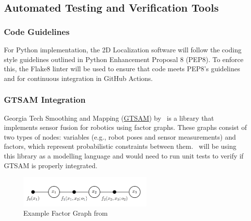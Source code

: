 \documentclass[12pt, titlepage]{article}
\begin{document}



\subsection{Automated Testing and Verification Tools}\label{plan_auto}

\subsubsection{Code Guidelines}
For Python implementation, the 2D Localization software will follow the coding style guidelines outlined in Python Enhancement Proposal 8 (PEP8). To enforce this, the Flake8 linter will be used to ensure that code meets PEP8's guidelines and for continuous integration in GitHub Actions.

\subsubsection{GTSAM Integration}
Georgia Tech Smoothing and Mapping (\href{https://github.com/borglab/gtsam}{GTSAM}) by~\cite{gtsam2022} is a library that implements sensor fusion for robotics using factor graphs. These graphs consist of two types of nodes: variables (e.g., robot poses and sensor measurements) and factors, which represent probabilistic constraints between them. \progname~will be using this library as a modelling language and would need to run unit tests to verify if GTSAM is properly integrated.

\begin{figure}[H]
  \begin{center}
    \includegraphics[width=0.6\textwidth]{factor_graph.png}
    \caption{Example Factor Graph from \cite{Dellaert2012}}
    \label{fig_factor} 
  \end{center}
\end{figure}
\end{document}
